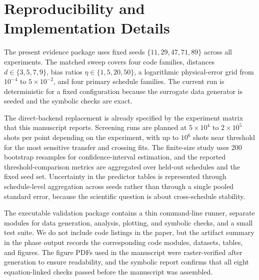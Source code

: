 \documentclass{article} %
\begin{document}
\section{Reproducibility and Implementation Details}
\label{app:repro}

The present evidence package uses fixed seeds $\{11,29,47,71,89\}$ across all experiments. The matched sweep covers four code families, distances $d \in \{3,5,7,9\}$, bias ratios $\eta \in \{1,5,20,50\}$, a logarithmic physical-error grid from $10^{-4}$ to $5\times 10^{-2}$, and four primary schedule families. The current run is deterministic for a fixed configuration because the surrogate data generator is seeded and the symbolic checks are exact.

The direct-backend replacement is already specified by the experiment matrix that this manuscript reports. Screening runs are planned at $5\times 10^4$ to $2\times 10^5$ shots per point depending on the experiment, with up to $10^6$ shots near threshold for the most sensitive transfer and crossing fits. The finite-size study uses 200 bootstrap resamples for confidence-interval estimation, and the reported threshold-comparison metrics are aggregated over held-out schedules and the fixed seed set. Uncertainty in the predictor tables is represented through schedule-level aggregation across seeds rather than through a single pooled standard error, because the scientific question is about cross-schedule stability.

The executable validation package contains a thin command-line runner, separate modules for data generation, analysis, plotting, and symbolic checks, and a small test suite. We do not include code listings in the paper, but the artifact summary in the phase output records the corresponding code modules, datasets, tables, and figures. The figure PDFs used in the manuscript were raster-verified after generation to ensure readability, and the symbolic report confirms that all eight equation-linked checks passed before the manuscript was assembled.
\end{document}
